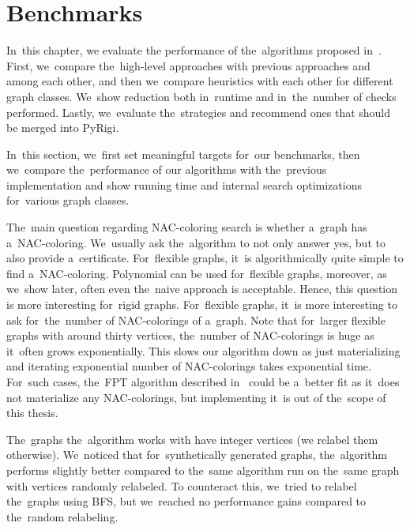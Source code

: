 \chapter{Benchmarks}%
\label{chapter:benchmarks}

\begin{chapterabstract}

	In~this chapter,
	we evaluate the performance of the~algorithms
	proposed in~.
	First, we~compare the~high-level approaches with previous approaches and among each other,
	and then we~compare heuristics with each other
	for different graph classes.
	We~show reduction both in~runtime and in~the~number
	of \IsNACColoring{} checks performed.
	Lastly, we~evaluate the~strategies and
	recommend ones that should be merged into PyRigi.

\end{chapterabstract}

In~this section, we~first set meaningful targets for~our benchmarks,
then we~compare the~performance of our algorithms with the~previous implementation
and show running time and internal search optimizations for~various graph classes.

The~main question regarding NAC-coloring search is whether a~graph has a~NAC-coloring.
We~usually ask the~algorithm to not only answer yes, but to also provide a~certificate.
%
For~flexible graphs, it~is algorithmically quite simple to find a~NAC-coloring.
Polynomial 
can be used for~flexible graphs,
 moreover, as we~show later, often even the~naive approach is acceptable.
Hence, this question is more interesting for~rigid graphs.
%
For~flexible graphs, it~is more interesting to ask for~the~number of NAC-colorings
of a~graph.
Note that for~larger flexible graphs with around thirty vertices,
the~number of NAC-colorings is huge as it~often grows exponentially.
This slows our algorithm down as just materializing and iterating exponential
number of NAC-colorings takes exponential time.
%
For~such cases, the~FPT algorithm described in~
could be a~better fit as it~does not materialize any NAC-colorings,
but implementing it~is out of the~scope of this thesis.

The~graphs the~algorithm works with have integer vertices (we relabel them otherwise).
We~noticed that for~synthetically generated graphs,
the~algorithm performs slightly better compared to
the~same algorithm run on the~same graph with vertices randomly relabeled.
To counteract this, we~tried to relabel the~graphs using BFS,
but we~reached no performance gains compared to the~random relabeling.

